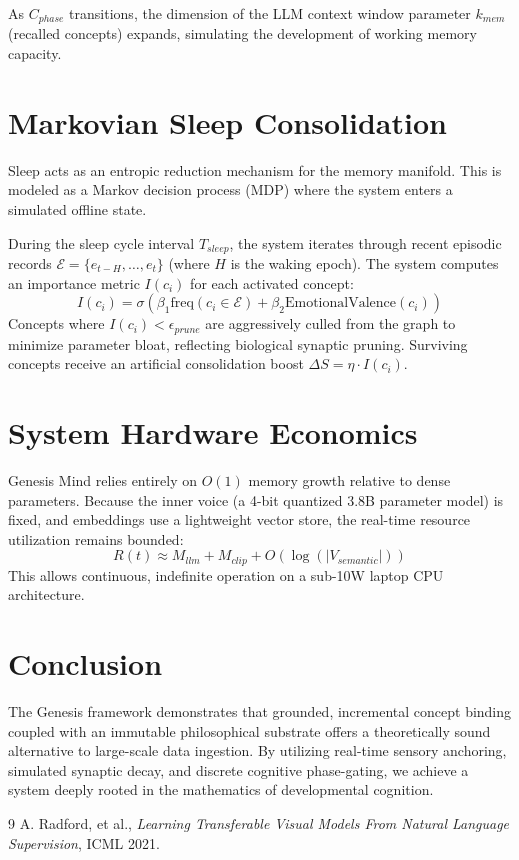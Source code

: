 \documentclass[11pt,twocolumn]{article}
\begin{document}
As $C_{phase}$ transitions, the dimension of the LLM context window parameter $k_{mem}$ (recalled concepts) expands, simulating the development of working memory capacity.

\section{Markovian Sleep Consolidation}
Sleep acts as an entropic reduction mechanism for the memory manifold. This is modeled as a Markov decision process (MDP) where the system enters a simulated offline state. 

During the sleep cycle interval $T_{sleep}$, the system iterates through recent episodic records $\mathcal{E} = \{e_{t-H}, \dots, e_t\}$ (where $H$ is the waking epoch). The system computes an importance metric $I(c_i)$ for each activated concept:
\[
I(c_i) = \sigma\left( \beta_1 \text{freq}(c_i \in \mathcal{E}) + \beta_2 \text{EmotionalValence}(c_i) \right)
\]
Concepts where $I(c_i) < \epsilon_{prune}$ are aggressively culled from the graph to minimize parameter bloat, reflecting biological synaptic pruning. Surviving concepts receive an artificial consolidation boost $\Delta S = \eta \cdot I(c_i)$.

\section{System Hardware Economics}
Genesis Mind relies entirely on $O(1)$ memory growth relative to dense parameters. Because the inner voice (a 4-bit quantized 3.8B parameter model) is fixed, and embeddings use a lightweight vector store, the real-time resource utilization remains bounded:
\[
R(t) \approx M_{llm} + M_{clip} + O(\log(|V_{semantic}|))
\]
This allows continuous, indefinite operation on a sub-10W laptop CPU architecture.

\section{Conclusion}
The Genesis framework demonstrates that grounded, incremental concept binding coupled with an immutable philosophical substrate offers a theoretically sound alternative to large-scale data ingestion. By utilizing real-time sensory anchoring, simulated synaptic decay, and discrete cognitive phase-gating, we achieve a system deeply rooted in the mathematics of developmental cognition.

\begin{thebibliography}{9}
A. Radford, et al., \textit{Learning Transferable Visual Models From Natural Language Supervision}, ICML 2021.
\end{thebibliography}
\end{document}
